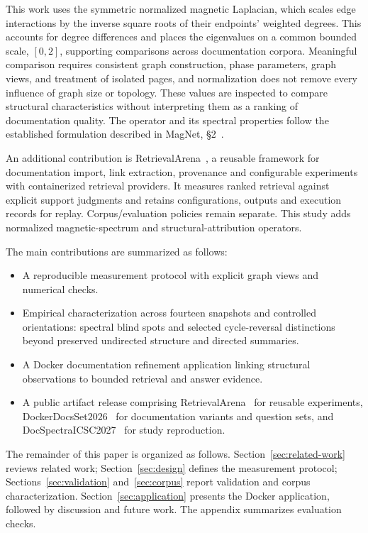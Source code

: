 This work uses the symmetric normalized magnetic Laplacian, which scales edge interactions by the inverse square roots of their endpoints' weighted degrees. This accounts for degree differences and places the eigenvalues on a common bounded scale, $[0,2]$, supporting comparisons across documentation corpora. Meaningful comparison requires consistent graph construction, phase parameters, graph views, and treatment of isolated pages, and normalization does not remove every influence of graph size or topology. These values are inspected to compare structural characteristics without interpreting them as a ranking of documentation quality. The operator and its spectral properties follow the established formulation described in MagNet, \S2~\cite{magnet2021}.

An additional contribution is RetrievalArena~\cite{retrievalarena}, a reusable
framework for documentation import, link extraction, provenance and configurable
experiments with containerized retrieval providers. It measures ranked retrieval
against explicit support judgments and retains configurations, outputs and
execution records for replay. Corpus/evaluation policies remain separate.
This study adds normalized magnetic-spectrum and structural-attribution operators.

The main contributions are summarized as follows:\nopagebreak[4]
\begin{itemize}
\item A reproducible measurement protocol with explicit graph views and numerical
checks.
\item Empirical characterization across fourteen snapshots and controlled
orientations: spectral blind spots and selected cycle-reversal distinctions
beyond preserved undirected structure and directed summaries.
\item A Docker documentation refinement application linking structural
observations to bounded retrieval and answer evidence.
\item A public artifact release comprising RetrievalArena~\cite{retrievalarena}
for reusable experiments, DockerDocsSet2026~\cite{dockerdocsset2026} for
documentation variants and question sets, and DocSpectraICSC2027~\cite{docspectraicsc2027}
for study reproduction.
\end{itemize}

The remainder of this paper is organized as follows.
Section~\ref{sec:related-work} reviews related work;
Section~\ref{sec:design} defines the measurement protocol;
Sections~\ref{sec:validation} and~\ref{sec:corpus} report validation and corpus
characterization. Section~\ref{sec:application} presents the Docker application,
followed by discussion and future work. The appendix summarizes evaluation checks.
